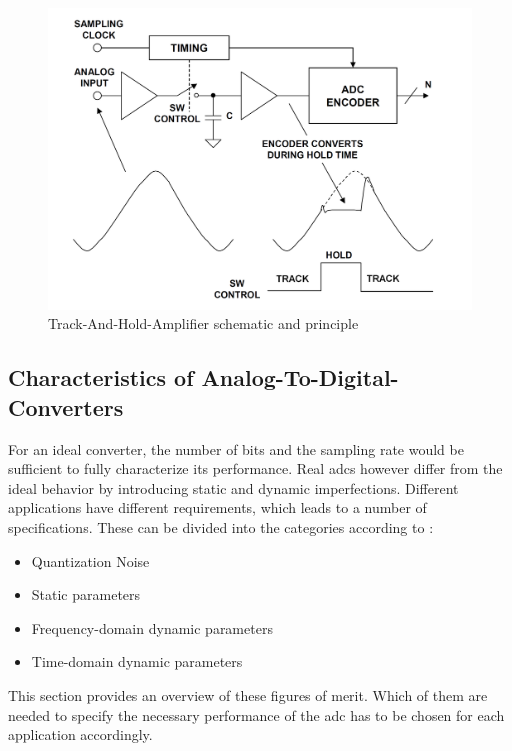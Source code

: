 \begin{figure}[tb]
	\centering
	\includegraphics[width = \textwidth]{chap/02-theory/img/adc/tha}
	\caption{Track-And-Hold-Amplifier schematic and principle \cite{walt}}
	\label{fig:tha}
\end{figure}

\subsection{Characteristics of Analog-To-Digital-Converters}\label{ssec:adc_charac}
For an ideal converter, the number of bits and the sampling rate would be sufficient to fully characterize its performance.
Real \glspl{adc} however differ from the ideal behavior by introducing static and dynamic imperfections.
Different applications have different requirements, which leads to a number of specifications.
These can be divided into the categories according to \cite{Lundberg}:
\begin{itemize}[noitemsep]
	\item Quantization Noise
	\item Static parameters
	\item Frequency-domain dynamic parameters
	\item Time-domain dynamic parameters
\end{itemize} %
This section provides an overview of these figures of merit.
Which of them are needed to specify the necessary performance of the \gls{adc} has to be chosen for each application accordingly.

